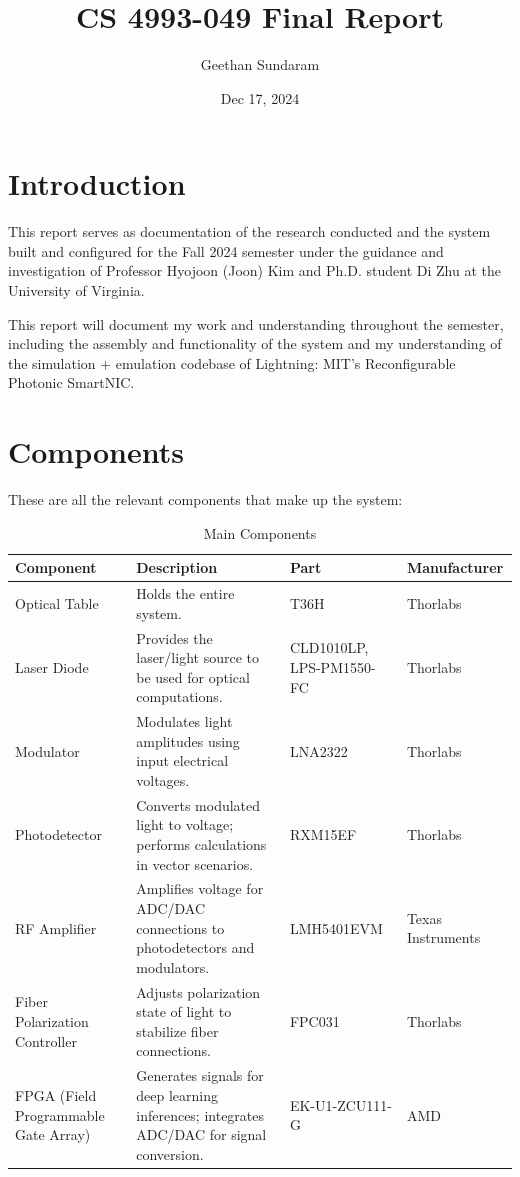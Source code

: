 \documentclass[11pt]{article}
\title{
  CS 4993-049
  Final Report 
}
\author{
  Geethan Sundaram
}
\date{
  Dec 17, 2024
}
\begin{document}
\maketitle


\section{Introduction}

This report serves as documentation of the research conducted and the system built and configured for the Fall 2024 semester under the guidance and investigation of Professor Hyojoon (Joon) Kim and Ph.D. student Di Zhu at the University of Virginia.

This report will document my work and understanding throughout the semester, including the assembly and functionality of the system and my understanding of the simulation + emulation codebase of Lightning: MIT's Reconfigurable Photonic SmartNIC.

\section{Components}

These are all the relevant components that make up the system:

\begin{table}[H]
\centering
\renewcommand{\arraystretch}{1.5}
\setlength{\tabcolsep}{6pt} %
\begin{tabular}{|p{}|p{}|p{}|p{}|}
\hline
\textbf{Component} & \textbf{Description} & \textbf{Part} & \textbf{Manufacturer} \\ \hline
Optical Table & Holds the entire system. & T36H & Thorlabs \\ \hline
Laser Diode & Provides the laser/light source to be used for optical computations. & CLD1010LP, LPS-PM1550-FC & Thorlabs \\ \hline
Modulator & Modulates light amplitudes using input electrical voltages. & LNA2322 & Thorlabs \\ \hline
Photodetector & Converts modulated light to voltage; performs calculations in vector scenarios. & RXM15EF & Thorlabs \\ \hline
RF Amplifier & Amplifies voltage for ADC/DAC connections to photodetectors and modulators. & LMH5401EVM & Texas Instruments \\ \hline
Fiber Polarization Controller & Adjusts polarization state of light to stabilize fiber connections. & FPC031 & Thorlabs \\ \hline
FPGA (Field Programmable Gate Array) & Generates signals for deep learning inferences; integrates ADC/DAC for signal conversion. & EK-U1-ZCU111-G & AMD \\ \hline
\end{tabular}
\caption{Main Components}
\label{table:components}
\end{table}
\end{document}
